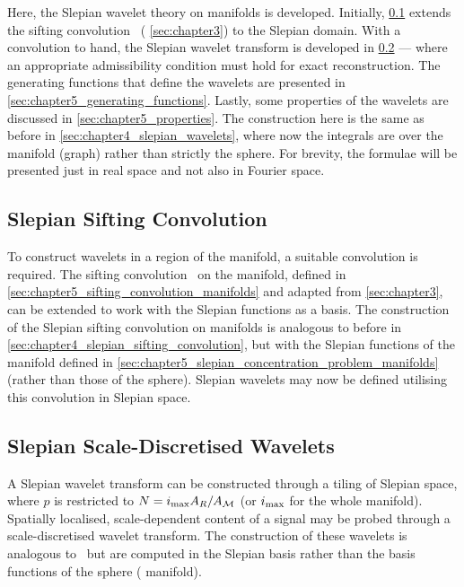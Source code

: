 Here, the Slepian wavelet theory on manifolds is developed.
Initially, \cref{sec:chapter5_slepian_sifting_convolution} extends the sifting convolution~\cite{Roddy2021} (\cf{} \cref{sec:chapter3}) to the Slepian domain.
With a convolution to hand, the Slepian wavelet transform is developed in \cref{sec:chapter5_slepian_scale_discretised_wavelets} --- where an appropriate admissibility condition must hold for exact reconstruction.
The generating functions that define the wavelets are presented in \cref{sec:chapter5_generating_functions}.
Lastly, some properties of the wavelets are discussed in \cref{sec:chapter5_properties}.
The construction here is the same as before in \cref{sec:chapter4_slepian_wavelets}, where now the integrals are over the manifold (graph) rather than strictly the sphere.
For brevity, the formulae will be presented just in real space and not also in Fourier space.

\subsection{Slepian Sifting Convolution}\label{sec:chapter5_slepian_sifting_convolution}

To construct wavelets in a region of the manifold, a suitable convolution is required.
The sifting convolution~\cite{Roddy2021} on the manifold, defined in \cref{sec:chapter5_sifting_convolution_manifolds} and adapted from \cref{sec:chapter3}, can be extended to work with the Slepian functions as a basis.
The construction of the Slepian sifting convolution on manifolds is analogous to before in \cref{sec:chapter4_slepian_sifting_convolution}, but with the Slepian functions of the manifold defined in \cref{sec:chapter5_slepian_concentration_problem_manifolds} (rather than those of the sphere).
Slepian wavelets may now be defined utilising this convolution in Slepian space.

\subsection{Slepian Scale-Discretised Wavelets}\label{sec:chapter5_slepian_scale_discretised_wavelets}

A Slepian wavelet transform can be constructed through a tiling of Slepian space, where \(p\) is restricted to \(N=i_{\text{max}} A_{R}/A_{\mathcal{M}}\) (or \(i_{\text{max}}{}\) for the whole manifold).
Spatially localised, scale-dependent content of a signal may be probed through a scale-discretised wavelet transform.
The construction of these wavelets is analogous to~\cite{Wiaux2008,McEwen2018} but are computed in the Slepian basis rather than the basis functions of the sphere (\cf{} manifold).

